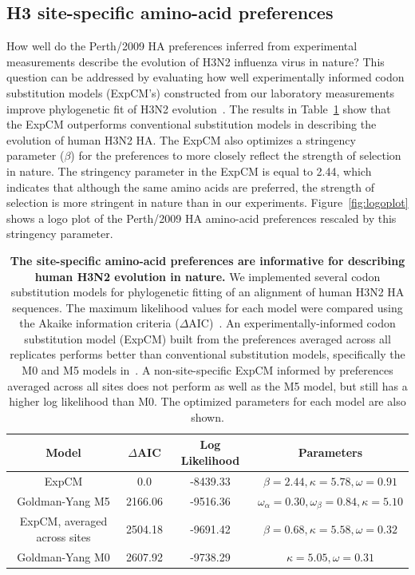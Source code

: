 \documentclass[11pt]{article}
\begin{document}
\subsection*{H3 site-specific amino-acid preferences}
How well do the Perth/2009 HA preferences inferred from experimental measurements describe the evolution of H3N2 influenza virus in nature?
This question can be addressed by evaluating how well experimentally informed codon substitution models (ExpCM's) constructed from our laboratory measurements improve phylogenetic fit of H3N2 evolution~\citep{hilton2017phydms}.
The results in Table~\ref{tab:phydms} show that the ExpCM outperforms conventional substitution models in describing the evolution of human H3N2 HA. 
The ExpCM also optimizes a stringency parameter ($\beta$) for the preferences to more closely reflect the strength of selection in nature.
The stringency parameter in the ExpCM is equal to 2.44, which indicates that although the same amino acids are preferred, the strength of selection is more stringent in nature than in our experiments.
Figure~\ref{fig:logoplot} shows a logo plot of the Perth/2009 HA amino-acid preferences rescaled by this stringency parameter.

\begin{table}
\centering
\begin{tabular}{cccc}
\hline
\bf{Model} & \bf{$\Delta$AIC} & \bf{Log Likelihood} & \bf{Parameters} \\ \hline
ExpCM & 0.0 & -8439.33 & $\beta = 2.44, \kappa = 5.78, \omega = 0.91$ \\
Goldman-Yang M5 & 2166.06 & -9516.36 & $\omega_{\alpha} = 0.30, \omega_{\beta} = 0.84, \kappa = 5.10$ \\
ExpCM, averaged across sites & 2504.18 & -9691.42 & $\beta = 0.68, \kappa = 5.58, \omega = 0.32$ \\
Goldman-Yang M0 & 2607.92 & -9738.29 & $\kappa = 5.05, \omega = 0.31$ \\
\hline
\end{tabular}
\caption{\label{tab:phydms}
{\bf The site-specific amino-acid preferences are informative for describing human H3N2 evolution in nature.}
We implemented several codon substitution models for phylogenetic fitting of an alignment of human H3N2 HA sequences. 
The maximum likelihood values for each model were compared using the Akaike information criteria ($\Delta$AIC)~\citep{posada2004model}.
An experimentally-informed codon substitution model (ExpCM) built from the preferences averaged across all replicates performs better than conventional substitution models, specifically the M0 and M5 models in~\cite{yang2000codon}.
A non-site-specific ExpCM informed by preferences averaged across all sites does not perform as well as the M5 model, but still has a higher log likelihood than M0.
The optimized parameters for each model are also shown.
}
\end{table}
\end{document}
